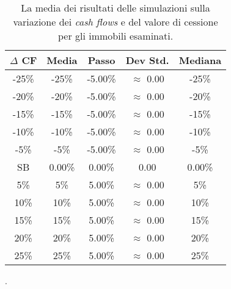 \begin{table}[htbp]
\begin{center}
\begin{tabular}[c]{|c||*{4}{c|}}
\hline
$\Delta$ CF & Media & Passo & Dev Std. & Mediana \\
\hline \hline
-25\% & -25\% & -5.00\% & $\approx$ 0.00 & -25\% \\ \hline
-20\% & -20\% & -5.00\% & $\approx$ 0.00 & -20\% \\ \hline
-15\% & -15\% & -5.00\% & $\approx$ 0.00 & -15\% \\ \hline
-10\% & -10\% & -5.00\% & $\approx$ 0.00 & -10\% \\ \hline
-5\% & -5\% & -5.00\% & $\approx$ 0.00 & -5\% \\ \hline
SB & 0.00\% & 0.00\% & 0.00 & 0.00\% \\ \hline
5\% & 5\% & 5.00\% & $\approx$ 0.00 & 5\% \\ \hline
10\% & 10\% & 5.00\% & $\approx$ 0.00 & 10\% \\ \hline
15\% & 15\% & 5.00\% & $\approx$ 0.00 & 15\% \\ \hline
20\% & 20\% & 5.00\% & $\approx$ 0.00 & 20\% \\ \hline
25\% & 25\% & 5.00\% & $\approx$ 0.00 & 25\% \\ \hline
\end{tabular}
\caption[Media risultati di $\Delta$ CF e valore di cessione]{La media dei risultati delle simulazioni sulla variazione dei {\itshape cash flows} e del valore di cessione per gli immobili esaminati.}.
\label{tab:varvcf2}
\end{center}
\end{table}

